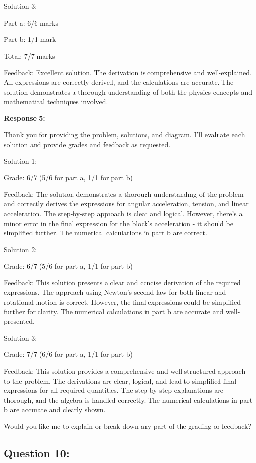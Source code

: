 \documentclass[a4paper,11pt]{article}
\begin{document}
Solution 3:

Part a: 6/6 marks

Part b: 1/1 mark

Total: 7/7 marks

Feedback: Excellent solution. The derivation is comprehensive and well-explained. All expressions are correctly derived, and the calculations are accurate. The solution demonstrates a thorough understanding of both the physics concepts and mathematical techniques involved.

\bigskip
\textbf{Response 5:}

Thank you for providing the problem, solutions, and diagram. I'll evaluate each solution and provide grades and feedback as requested.

Solution 1:

Grade: 6/7 (5/6 for part a, 1/1 for part b)

Feedback: The solution demonstrates a thorough understanding of the problem and correctly derives the expressions for angular acceleration, tension, and linear acceleration. The step-by-step approach is clear and logical. However, there's a minor error in the final expression for the block's acceleration - it should be simplified further. The numerical calculations in part b are correct.

Solution 2:

Grade: 6/7 (5/6 for part a, 1/1 for part b)

Feedback: This solution presents a clear and concise derivation of the required expressions. The approach using Newton's second law for both linear and rotational motion is correct. However, the final expressions could be simplified further for clarity. The numerical calculations in part b are accurate and well-presented.

Solution 3:

Grade: 7/7 (6/6 for part a, 1/1 for part b)

Feedback: This solution provides a comprehensive and well-structured approach to the problem. The derivations are clear, logical, and lead to simplified final expressions for all required quantities. The step-by-step explanations are thorough, and the algebra is handled correctly. The numerical calculations in part b are accurate and clearly shown.

Would you like me to explain or break down any part of the grading or feedback?

\subsection*{Question 10:}
\end{document}
